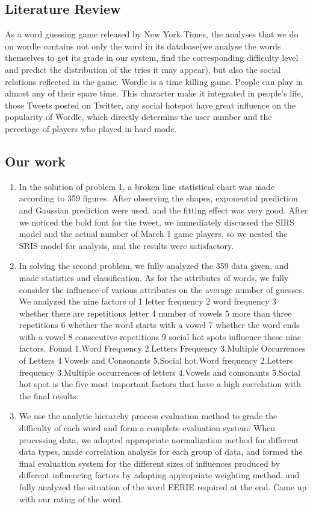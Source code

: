 \documentclass[12pt]{article}  %
\begin{document}
\subsection{Literature Review}
  As a word guessing game released by New York Times, the analyses that we do on wordle contains not only the word in its database(we analyse the words themselves to get its grade in our system, find the corresponding difficulty level and predict the distribution of the tries it may appear), but also the social relations reflected in the game. Wordle is a time killing game. People can play in almost any of their spare time. This character make it integrated in people's life, those Tweets posted on Twitter, any social hotspot have great influence on the popularity of Wordle, which directly determins the user number and the percetage of players who played in hard mode. 

\subsection{Our work}


\begin{enumerate}[\bfseries 1.]
    \item In the solution of problem 1, a broken line statistical chart was made according to 359 figures. After observing the shapes, exponential prediction and Gaussian prediction were used, and the fitting effect was very good. After we noticed the bold font for the tweet, we immediately discussed the SIRS model and the actual number of March 1 game players, so we nested the SRIS model for analysis, and the results were satisfactory.
    \item In solving the second problem, we fully analyzed the 359 data given, and made statistics and classification. As for the attributes of words, we fully consider the influence of various attributes on the average number of guesses. We analyzed the nine factors of 1 letter frequency 2 word frequency 3 whether there are repetitions letter 4 number of vowels 5 more than three repetitions 6 whether the word starts with a vowel 7 whether the word ends with a vowel 8 consecutive repetitions 9 social hot spots influence these nine factors. Found 1.Word Frequency 2.Letters Frequency 3.Multiple Occurrences of Letters 4.Vowels and Consonants 5.Social hot.Word frequency 2.Letters frequency 3.Multiple occurrences of letters 4.Vowels and consonants 5.Social hot spot is the five most important factors that have a high correlation with the final results.
    
    \item We use the analytic hierarchy process evaluation method to grade the difficulty of each word and form a complete evaluation system. When processing data, we adopted appropriate normalization method for different data types, made correlation analysis for each group of data, and formed the final evaluation system for the different sizes of influences produced by different influencing factors by adopting appropriate weighting method, and fully analyzed the situation of the word EERIE required at the end. Came up with our rating of the word.
\end{enumerate}
\end{document}
